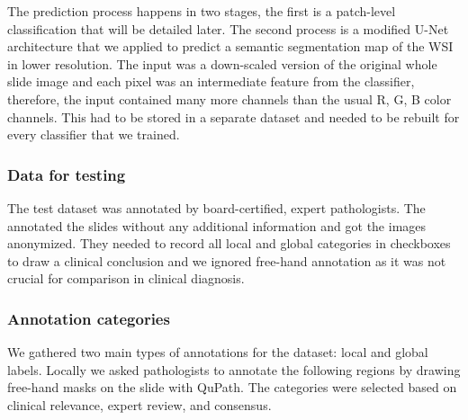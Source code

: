 \documentclass[a4paper,12pt]{article}
\begin{document}
\vspace{7mm}

\par The prediction process happens in two stages, the first is a patch-level classification that will be detailed later. The second process is a modified U-Net \cite{ronneberger2015u} architecture that we applied to predict a semantic segmentation map of the WSI in lower resolution. The input was a down-scaled version of the original whole slide image and each pixel was an intermediate feature from the classifier, therefore, the input contained many more channels than the usual R, G, B color channels. This had to be stored in a separate dataset and needed to be rebuilt for every classifier that we trained.

\vspace{4mm}

\subsubsection{Data for testing}

\vspace{4mm}

\par The test dataset was annotated by board-certified, expert pathologists. The annotated the slides without any additional information and got the images anonymized. They needed to record all local and global categories in checkboxes to draw a clinical conclusion and we ignored free-hand annotation as it was not crucial for comparison in clinical diagnosis. 

\vspace{4mm}

\subsubsection{Annotation categories}

\vspace{4mm}

\par We gathered two main types of annotations for the dataset: local and global labels. Locally we asked pathologists to annotate the following regions by drawing free-hand masks on the slide with QuPath. The categories were selected based on clinical relevance, expert review, and consensus.

\vspace{4mm}
\end{document}
